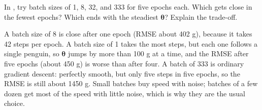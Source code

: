 \begin{Exercise}[label=gd6, title={Batch size}]
In , try batch sizes of 1, 8, 32, and 333 for five epochs each. Which gets close
in the fewest epochs? Which ends with the steadiest $\boldsymbol{\theta}$? Explain the trade-off.
\end{Exercise}
\begin{Answer}[ref=gd6]
A batch size of 8 is close after one epoch (RMSE about 402 g), because it takes 42 steps per epoch. A batch
size of 1 takes the most steps, but each one follows a single penguin, so $\boldsymbol{\theta}$ jumps by
more than 100 g at a time, and the RMSE after five epochs (about 450 g) is worse than after four. A batch of 333
is ordinary gradient descent: perfectly smooth, but only five steps in five epochs, so the RMSE is still about
1450 g. Small batches buy speed with noise; batches of a few dozen get most of the speed with little noise,
which is why they are the usual choice.
\end{Answer}
